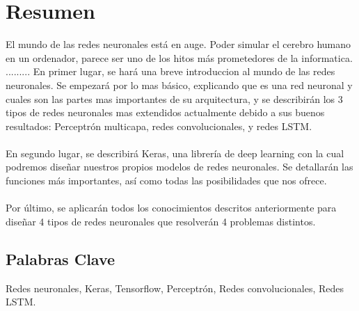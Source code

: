\chapter*{Resumen}
El mundo de las redes neuronales está en auge. Poder simular el cerebro humano en un ordenador, parece ser uno de los hitos más prometedores de la informatica. .........
En primer lugar, se hará una breve introduccion al mundo de las redes neuronales. Se empezará por lo mas básico, explicando que es una red neuronal y cuales son las partes mas importantes de su arquitectura, y se describirán los 3 tipos de redes neuronales mas extendidos actualmente debido a sus buenos resultados: Perceptrón multicapa, redes convolucionales, y redes LSTM.\\\\
En segundo lugar, se describirá Keras, una librería de deep learning con la cual podremos diseñar nuestros propios modelos de redes neuronales. Se detallarán las funciones más importantes, así como todas las posibilidades que nos ofrece.\\\\
Por último, se aplicarán todos los conocimientos descritos anteriormente para diseñar 4 tipos de redes neuronales que resolverán 4 problemas distintos.

\section*{Palabras Clave}
Redes neuronales, Keras, Tensorflow, Perceptrón, Redes convolucionales, Redes LSTM.